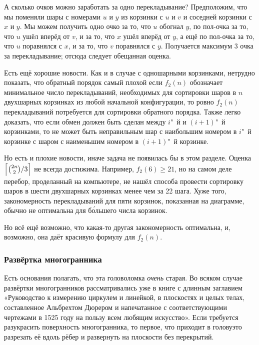 \documentclass[twoside]{book}
\begin{document}
А сколько очков можно заработать за одно перекладывание?
Предположим, что мы поменяли шары с номерами $u$ и $y$ из корзинки с $u$ и $v$ и соседней корзинки с $x$ и $y$.
Мы можем получить одно очко за то, что $u$ обогнал $y$,
по пол-очка за то, что $u$ ушёл вперёд от $v$,
и за то, что $x$ ушёл вперёд от $y$,
а ещё по пол-очка за то, что $u$ поравнялся с $x$, 
и за то, что $v$ поравнялся с $y$.
Получается максимум 3 очка за перекладывание;
отсюда следует обещанная оценка.


Есть ещё хорошие новости.
Как и в случае с одношарными корзинками, нетрудно показать, что обратный порядок самый плохой если $f_2(n)$ обозначает минимальное число перекладываний, необходимых для сортировки шаров в $n$ двухшарных корзинках из любой начальной конфигурации, то ровно $f_2(n)$ перекладываний потребуется для сортировки обратного порядка.
Также легко доказать, что если обмен должен быть сделан между $i$"~й и $(i+1)$"~й корзинками, то не может быть неправильным  шар с наибольшим номером в $i$"~й корзинке с шаром с наименьшим номером в $(i+1)$"~й корзинке.

Но есть и плохие новости, иначе задача не появилась бы в этом разделе.
Оценка $\Bigl\lceil\binom{2n}{2}/3\Bigr\rceil$ не всегда достижима.
Например,  $f_2(6)\ge 21$, но на самом деле перебор, проделанный на компьютере, не нашёл способа провести сортировку шаров в шести двухшарных корзинках менее чем за 22 шага.
Хуже того, закономерность перекладываний для пяти корзинок, показанная на диаграмме, обычно не оптимальна для б\'{о}льшего числа корзинок.

Но всё ещё возможно, что какая-то другая закономерность оптимальна, и, возможно, она даёт красивую формулу для $f_2(n)$.

\subsubsection*{Развёртка многогранника}

Есть основания полагать, что эта головоломка \emph{очень} старая. 
Во всяком случае развёртки многогранников рассматривались уже в книге с длинным заглавием «Руководство к измерению циркулем и линейкой, в плоскостях и целых телах, составленное Альбрехтом Дюрером и напечатанное с соответствующими чертежами в 1525 году на пользу всем любящим искусство».
Если требуется разукрасить поверхность многогранника, то первое, что приходит в головуэто разрезать её вдоль рёбер и развернуть на плоскости без перекрытий.
\end{document}
